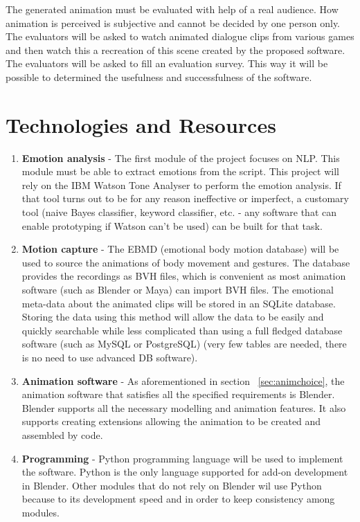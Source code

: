 The generated animation must be evaluated with help of a real audience. How animation is perceived is subjective and cannot be decided by one person only. The evaluators will be asked to watch animated dialogue clips from various games and then watch this a recreation of this scene created by the proposed software. The evaluators will be asked to fill an evaluation survey. This way it will be possible to determined the usefulness and successfulness of the software.


\section{Technologies and Resources}

\begin{enumerate}
\item \textbf{Emotion analysis} - The first module of the project focuses on NLP. This module must be able to extract emotions from the script. This project will rely on the IBM Watson Tone Analyser to perform the emotion analysis. If that tool turns out to be for any reason ineffective or imperfect, a customary tool (naive Bayes classifier, keyword classifier, etc. - any software that can enable prototyping if Watson can't be used) can be built for that task.

\item \textbf{Motion capture} - The EBMD (emotional body motion database) will be used to source the animations of body movement and gestures. The database provides the recordings as BVH files, which is convenient as most animation software (such as Blender or Maya) can import BVH files. The emotional meta-data about the animated clips will be stored in an SQLite database. Storing the data using this method will allow the data to be easily and quickly searchable while less complicated than using a full fledged database software (such as MySQL or PostgreSQL) (very few tables are needed, there is no need to use advanced DB software).

\item \textbf{Animation software} - As aforementioned in section ~\ref{sec:animchoice}, the animation software that satisfies all the specified requirements is Blender. Blender supports all the necessary modelling and animation features. It also supports creating extensions allowing the animation to be created and assembled by code.

\item \textbf{Programming} - Python programming language will be used to implement the software. Python is the only language supported for add-on development in Blender. Other modules that do not rely on Blender wil use Python because to its development speed and in order to keep consistency among modules.

\end{enumerate}

